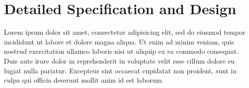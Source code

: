 \documentclass[report.tex]{subfiles}
\begin{document}
\chapter{Detailed Specification and Design} %
\label{cha:detailed_specification_and_design}
Lorem ipsum dolor sit amet, consectetur adipisicing elit, sed do eiusmod
tempor incididunt ut labore et dolore magna aliqua. Ut enim ad minim veniam,
quis nostrud exercitation ullamco laboris nisi ut aliquip ex ea commodo
consequat. Duis aute irure dolor in reprehenderit in voluptate velit esse
cillum dolore eu fugiat nulla pariatur. Excepteur sint occaecat cupidatat non
proident, sunt in culpa qui officia deserunt mollit anim id est laborum.

\newpage
\end{document}
